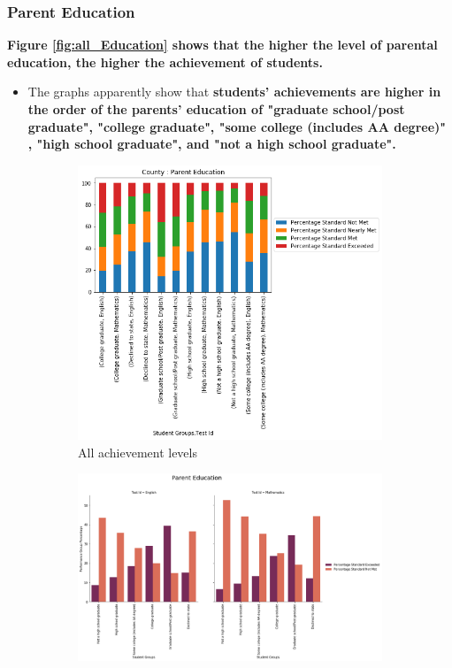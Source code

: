 \documentclass[11pt]{article}
\begin{document}
    
\subsubsection{Parent Education}
\textbf{Figure \ref{fig:all_Education} shows that the higher the level of parental education, the higher the achievement of students.}
\begin{itemize}
	\item The graphs apparently show that \textbf{students' achievements are higher in the order of the parents' education of "graduate school/post graduate", "college graduate", "some college (includes AA degree)" , "high school graduate", and "not a high school graduate".}
\end{itemize}

\begin{figure}[h!]
\centering
\begin{subfigure}{0.35\textwidth}
         \centering
         \includegraphics[width=\textwidth]{output_40_0.png}
         \caption{All achievement levels}
         \label{fig:Education_all}
\end{subfigure}
\hfill
\begin{subfigure}{0.6\textwidth}
         \centering
         \includegraphics[width=\textwidth]{output_41_1.png}

\end{subfigure}
\end{figure}
\end{document}
